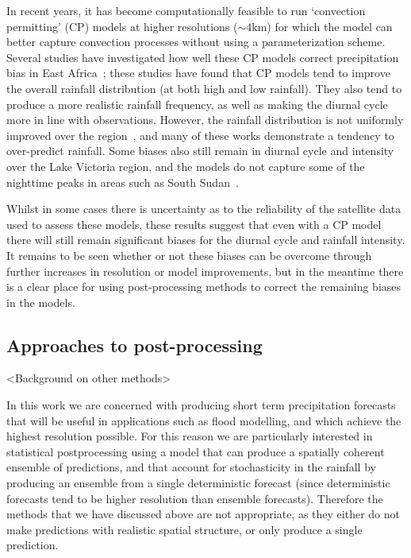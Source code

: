 \documentclass{article}
\begin{document}
In recent years, it has become computationally feasible to run `convection permitting' (CP) models at higher resolutions ($\sim4\text{km}$) for which the model can better capture convection processes without using a parameterization scheme. Several studies have investigated how well these CP models correct precipitation bias in East Africa~\citep{finney_implications_2019, cafaro_convection-permitting_2021, woodhams_what_2018, chamberlain_forecasting_2014, kendon_enhanced_2019, senior_convection-permitting_2021}; these studies have found that CP models tend to improve the overall rainfall distribution (at both high and low rainfall). They also tend to produce a more realistic rainfall frequency, as well as making the diurnal cycle more in line with observations. However, the rainfall distribution is not uniformly improved over the region~\citep{senior_convection-permitting_2021}, and many of these works demonstrate a tendency to over-predict rainfall. Some biases also still remain in diurnal cycle and intensity over the Lake Victoria region, and the models do not capture some of the nighttime peaks in areas such as South Sudan~\citep{finney_implications_2019, chamberlain_forecasting_2014}. 

Whilst in some cases there is uncertainty as to the reliability of the satellite data used to assess these models, these results suggest that even with a CP model there will still remain significant biases for the diurnal cycle and rainfall intensity. It remains to be seen whether or not these biases can be overcome through further increases in resolution or model improvements, but in the meantime there is a clear place for using post-processing methods to correct the remaining biases in the models.


\subsection{Approaches to post-processing}

<Background on other methods>


In this work we are concerned with producing short term precipitation forecasts that will be useful in applications such as flood modelling, and which achieve the highest resolution possible. For this reason we are particularly interested in statistical postprocessing using a model that can produce a spatially coherent ensemble of predictions, and that account for stochasticity in the rainfall by producing an ensemble from a single deterministic forecast (since deterministic forecasts tend to be higher resolution than ensemble forecasts). Therefore the methods that we have discussed above are not appropriate, as they either do not make predictions with realistic spatial structure, or only produce a single prediction. 
\end{document}
